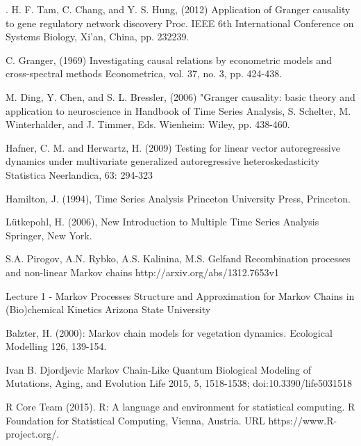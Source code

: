
\begin{thebibliography}{00}

. H. F. Tam, C. Chang, and Y. S. Hung, (2012)
\newblock Application of Granger causality to gene regulatory network discovery  
\newblock Proc. IEEE 6th International Conference on Systems Biology, Xi'an, China, pp. 232239.

 C. Granger, (1969)
\newblock Investigating causal relations by econometric models and cross-spectral methods
\newblock Econometrica, vol. 37, no. 3, pp. 424-438.

M. Ding, Y. Chen, and S. L. Bressler, (2006)
\newblock "Granger causality: basic theory and application to neuroscience 
\newblock in Handbook of Time Series Analysis, S. Schelter, M. Winterhalder, and J. Timmer, Eds. Wienheim: Wiley, pp. 438-460.

 Hafner, C. M. and Herwartz, H. (2009) 
\newblock Testing for linear vector autoregressive dynamics under multivariate generalized autoregressive heteroskedasticity 
\newblock Statistica Neerlandica, 63: 294-323

Hamilton, J. (1994), 
\newblock Time Series Analysis 
\newblock Princeton University Press, Princeton.

Lütkepohl, H. (2006), 
\newblock New Introduction to Multiple Time Series Analysis
\newblock Springer, New York.

S.A. Pirogov, A.N. Rybko, A.S. Kalinina, M.S. Gelfand
\newblock Recombination processes and non-linear Markov chains
\newblock http://arxiv.org/abs/1312.7653v1

Lecture 1 - Markov Processes
\newblock Structure  and  Approximation  for  Markov  Chains in  (Bio)chemical  Kinetics
\newblock Arizona State University

Balzter, H. (2000): 
\newblock Markov chain models for vegetation dynamics. 
\newblock Ecological Modelling 126, 139-154.

Ivan B. Djordjevic
\newblock Markov Chain-Like Quantum Biological Modeling of Mutations, Aging, and Evolution 
\newblock Life 2015, 5, 1518-1538; doi:10.3390/life5031518 

R Core Team (2015). 
\newblock R: A language and environment for statistical computing. R Foundation for Statistical Computing, Vienna, Austria.
\newblock URL https://www.R-project.org/.
\end{thebibliography}

